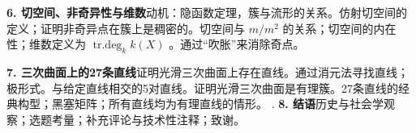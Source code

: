 \noindent
\textbf{6. 切空间、非奇异性与维数}\quad 动机：隐函数定理，簇与流形的关系。仿射切空间的定义；证明非奇异点在簇上是稠密的。切空间与 \(m/m^{2}\) 的关系；切空间的内在性；维数定义为 \({\operatorname{tr.deg}}_{k}k\left( X\right)\) 。通过“吹胀”来消除奇点。

\noindent
\textbf{7. 三次曲面上的27条直线}\quad 证明光滑三次曲面上存在直线。通过消元法寻找直线；极形式。与给定直线相交的5对直线。证明光滑三次曲面是有理簇。27条直线的经典构型；黑塞矩阵；所有直线均为有理直线的情形。
.
\noindent
\textbf{8. 结语}\quad 历史与社会学观察；选题考量；补充评论与技术性注释；致谢。